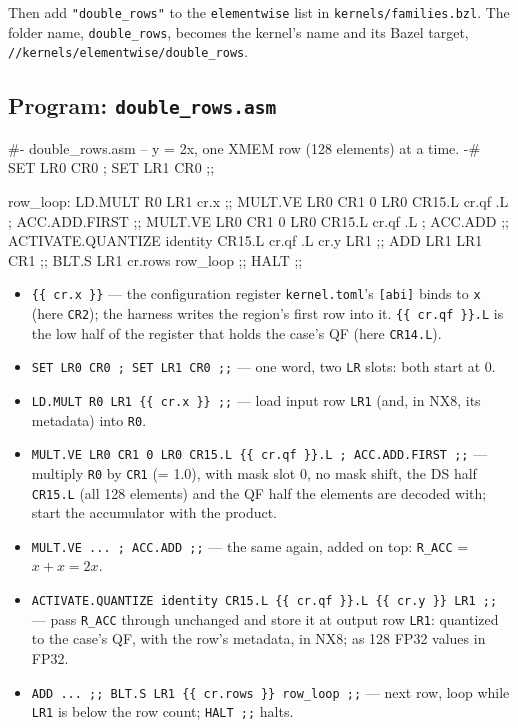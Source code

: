 \documentclass[11pt,a4paper]{article}
\begin{document}
Then add \texttt{"double\_rows"} to the \texttt{elementwise} list in
\texttt{kernels/families.bzl}. The folder name, \texttt{double\_rows}, becomes
the kernel's name and its Bazel target, \texttt{//kernels/elementwise/double\_rows}.

\subsection{Program: \texttt{double\_rows.asm}}

\begin{pycode}
{#- double_rows.asm -- y = 2x, one XMEM row (128 elements) at a time. -#}
    SET LR0 CR0 ;
    SET LR1 CR0 ;;

row_loop:
    LD.MULT R0 LR1 {{ cr.x }} ;;
    MULT.VE LR0 CR1 0 LR0 CR15.L {{ cr.qf }}.L ;
    ACC.ADD.FIRST ;;
    MULT.VE LR0 CR1 0 LR0 CR15.L {{ cr.qf }}.L ;
    ACC.ADD ;;
    ACTIVATE.QUANTIZE identity CR15.L {{ cr.qf }}.L {{ cr.y }} LR1 ;;
    ADD LR1 LR1 CR1 ;;
    BLT.S LR1 {{ cr.rows }} row_loop ;;
    HALT ;;
\end{pycode}

\begin{itemize}
\item \texttt{\{\{ cr.x \}\}} --- the configuration register \texttt{kernel.toml}'s
  \texttt{[abi]} binds to \texttt{x} (here \texttt{CR2}); the harness writes
  the region's first row into it. \texttt{\{\{ cr.qf \}\}.L} is the low half
  of the register that holds the case's QF (here \texttt{CR14.L}).
\item \texttt{SET LR0 CR0 ; SET LR1 CR0 ;;} --- one word, two \texttt{LR}
  slots: both start at 0.
\item \texttt{LD.MULT R0 LR1 \{\{ cr.x \}\} ;;} --- load input row
  \texttt{LR1} (and, in NX8, its metadata) into \texttt{R0}.
\item \texttt{MULT.VE LR0 CR1 0 LR0 CR15.L \{\{ cr.qf \}\}.L ; ACC.ADD.FIRST ;;}
  --- multiply \texttt{R0} by \texttt{CR1} (= 1.0), with mask slot 0, no mask
  shift, the DS half \texttt{CR15.L} (all 128 elements) and the QF half the
  elements are decoded with; start the accumulator with the product.
\item \texttt{MULT.VE ... ; ACC.ADD ;;} --- the same again, added on top:
  \texttt{R\_ACC} = $x + x = 2x$.
\item \texttt{ACTIVATE.QUANTIZE identity CR15.L \{\{ cr.qf \}\}.L \{\{ cr.y \}\} LR1 ;;}
  --- pass \texttt{R\_ACC} through unchanged and store it at output row
  \texttt{LR1}: quantized to the case's QF, with the row's metadata, in NX8;
  as 128 FP32 values in FP32.
\item \texttt{ADD ... ;; BLT.S LR1 \{\{ cr.rows \}\} row\_loop ;;} --- next
  row, loop while \texttt{LR1} is below the row count; \texttt{HALT ;;} halts.
\end{itemize}
\end{document}
